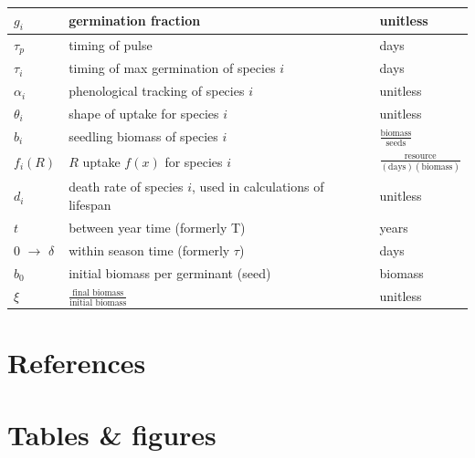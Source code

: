 \documentclass[11pt,letter]{article}
\begin{document}
\begin{center}
\begin{table}[h!]
\begin{tabular}{ | p{3.0cm} | p{6.0cm} | p{4.0cm} |}
\(g_{i}\) & germination fraction & unitless \\ \hline
\(\tau_{p}\) & timing of pulse & days \\ \hline
\(\tau_{i}\) & timing of max germination of species \(i\) & days \\ \hline
\(\alpha_{i}\) & phenological tracking of species \(i\) & unitless \\ \hline
\(\theta_{i}\) & shape of uptake for species \(i\) & unitless\\ \hline
\hline
\(b_{i}\) & seedling biomass of species \(i\) & \(\frac{\text{biomass}}{\text{seeds}}\) \\ \hline
\(f_{i}(R)\) & \(R\) uptake \(f(x)\) for species \(i\) & \(\frac{\text{resource}}{(\text{days})(\text{biomass})}\)\\ \hline
\(d_{i}\) & death rate of species \(i\), used in calculations of lifespan & unitless \\ \hline
\(t\) & between year time (formerly T) & years \\ \hline
\(0\) $\rightarrow$ \(\delta\) & within season time (formerly \(\tau\)) & days \\ \hline
\(b_{0}\) & initial biomass per germinant (seed) & biomass \\ \hline
\(\xi\) & \(\frac{\text{final biomass}}{\text{initial biomass}}\) & unitless \\ \hline
\hline
\end{tabular}
\end{table}
\end{center}

\section{References}



\clearpage
\section{Tables \& figures}
\end{document}
